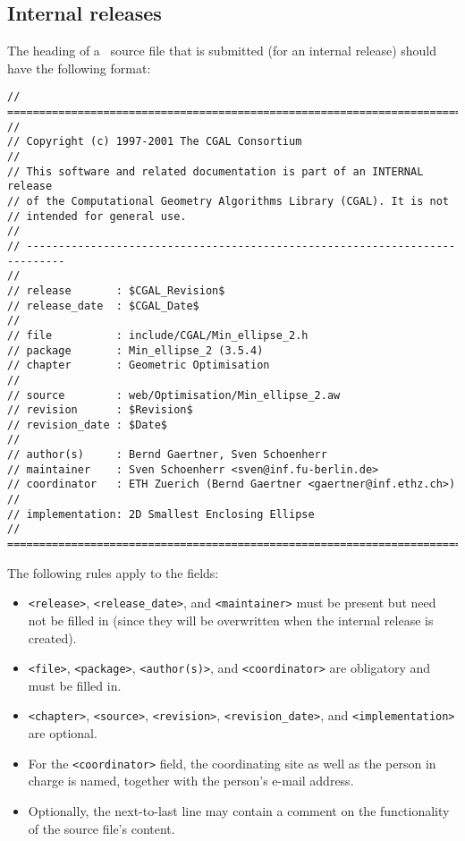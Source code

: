 \subsection*{Internal releases}

The heading of a \cgal\ source file that is submitted (for an internal release)
should have the following format:

\begin{verbatim}
// ============================================================================
//
// Copyright (c) 1997-2001 The CGAL Consortium
//
// This software and related documentation is part of an INTERNAL release
// of the Computational Geometry Algorithms Library (CGAL). It is not
// intended for general use.
//
// ----------------------------------------------------------------------------
//
// release       : $CGAL_Revision$
// release_date  : $CGAL_Date$
//
// file          : include/CGAL/Min_ellipse_2.h
// package       : Min_ellipse_2 (3.5.4)
// chapter       : Geometric Optimisation
//
// source        : web/Optimisation/Min_ellipse_2.aw
// revision      : $Revision$
// revision_date : $Date$
//
// author(s)     : Bernd Gaertner, Sven Schoenherr
// maintainer    : Sven Schoenherr <sven@inf.fu-berlin.de>
// coordinator   : ETH Zuerich (Bernd Gaertner <gaertner@inf.ethz.ch>)
//
// implementation: 2D Smallest Enclosing Ellipse
// ============================================================================
\end{verbatim}

The following rules apply to the fields:

\begin{itemize}
\item {\tt <release>}, {\tt <release\_date>}, and {\tt <maintainer>} must be 
      present but need not be filled in (since they will be overwritten when 
      the internal release is created). 
\item {\tt <file>}, {\tt <package>}, {\tt <author(s)>}, and
      {\tt <coordinator>} are obligatory and must be filled in.
\item {\tt <chapter>}, {\tt <source>}, {\tt <revision>}, {\tt <revision\_date>},
      and {\tt <implementation>} are optional.
\item For the {\tt <coordinator>} field, the coordinating site as well as
      the person in charge is named, together with the person's e-mail address.
\item Optionally, the next-to-last line may contain a comment on the
      functionality of the source file's content.
\end{itemize}

